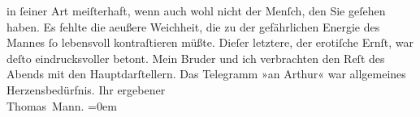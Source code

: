 \begin{ledgroupsized}[t]{13cm}
                    in ſeiner Art meiſter{\pb}haft, wenn auch
                    wohl nicht der Menſch, den Sie geſehen haben. Es fehlte die aeußere Weichheit,
                    die zu der gefährlichen Energie des Mannes ſo lebensvoll kontraſtieren müßte.
                    Dieſer letztere, der erotiſche Ernſt, war deſto eindrucksvoller betont. Mein Bruder und ich verbrachten
                    den Reſt des Abends \introOben{}mit\introOben{} den Hauptdarſtellern. Das
                    Telegramm »an Arthur« war allgemeines Herzensbedürfnis.\pend
           \pstart
           Ihr ergebener{\\[\baselineskip]}\spacefill\mbox{Thomas Mann.}\pend
           \leftskip=0em{}          \endnumbering{}\end{ledgroupsized}  \newcommand{\dateiname}{L02039}\newcommand{\titel}{Thomas Mann an Arthur Schnitzler, 16. 10. 1911}\newcommand{\editorInnen}{Martin Anton Müller und Gerd-Hermann Susen}
            \footnotesize
\begin{ledgroupsized}[t]{11.5cm}
\end{ledgroupsized}
         
      